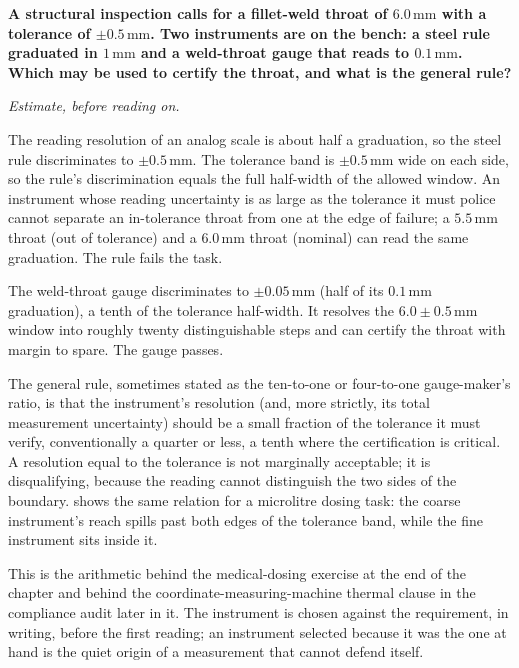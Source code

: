 \begin{estimation}
\textbf{A structural inspection calls for a fillet-weld throat of
$6.0 \,\si{\milli\meter}$ with a tolerance of
$\pm 0.5 \,\si{\milli\meter}$. Two instruments are on the bench: a
steel rule graduated in $1 \,\si{\milli\meter}$ and a weld-throat gauge
that reads to $0.1 \,\si{\milli\meter}$. Which may be used to certify
the throat, and what is the general rule?}

\smallskip
\textit{Estimate, before reading on.}

\smallskip
The reading resolution of an analog scale is about half a graduation,
so the steel rule discriminates to $\pm 0.5 \,\si{\milli\meter}$. The
tolerance band is $\pm 0.5 \,\si{\milli\meter}$ wide on each side, so
the rule's discrimination equals the full half-width of the allowed
window. An instrument whose reading uncertainty is as large as the
tolerance it must police cannot separate an in-tolerance throat from
one at the edge of failure; a $5.5 \,\si{\milli\meter}$ throat (out of
tolerance) and a $6.0 \,\si{\milli\meter}$ throat (nominal) can read
the same graduation. The rule fails the task.

The weld-throat gauge discriminates to $\pm 0.05 \,\si{\milli\meter}$
(half of its $0.1 \,\si{\milli\meter}$ graduation), a tenth of the
tolerance half-width. It resolves the $6.0 \pm 0.5 \,\si{\milli\meter}$
window into roughly twenty distinguishable steps and can certify the
throat with margin to spare. The gauge passes.

The general rule, sometimes stated as the ten-to-one or four-to-one
gauge-maker's ratio, is that the instrument's resolution (and, more
strictly, its total measurement uncertainty) should be a small
fraction of the tolerance it must verify, conventionally a quarter or
less, a tenth where the certification is critical. A resolution equal
to the tolerance is not marginally acceptable; it is disqualifying,
because the reading cannot distinguish the two sides of the boundary.
 shows the same relation for
a microlitre dosing task: the coarse instrument's reach spills past
both edges of the tolerance band, while the fine instrument sits inside
it.
\end{estimation}



This is the arithmetic behind the medical-dosing exercise at the end of
the chapter and behind the coordinate-measuring-machine thermal clause
in the compliance audit later in it. The instrument is chosen against
the requirement, in writing, before the first reading; an instrument
selected because it was the one at hand is the quiet origin of a
measurement that cannot defend itself.

